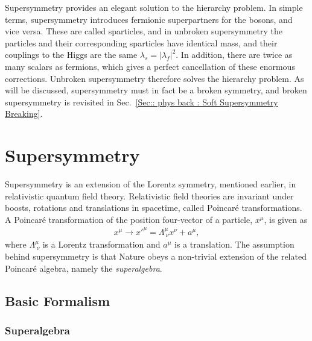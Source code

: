\documentclass[twoside,english]{uiofysmaster}
\begin{document}
Supersymmetry provides an elegant solution to the hierarchy problem. In simple terms, supersymmetry introduces fermionic superpartners for the bosons, and vice versa. These are called sparticles, and in unbroken supersymmetry the particles and their corresponding sparticles have identical mass, and their couplings to the Higgs are the same $\lambda_s = |\lambda_f|^2$. In addition, there are twice as many scalars as fermions, which gives a perfect cancellation of these enormous corrections. Unbroken supersymmetry therefore solves the hierarchy problem. As will be discussed, supersymmetry must in fact be a broken symmetry, and broken supersymmetry is revisited in Sec.~\ref{Sec:: phys back : Soft Supersymmetry Breaking}.


\section{Supersymmetry}

Supersymmetry is an extension of the Lorentz symmetry, mentioned earlier, in relativistic quantum field theory. Relativistic field theories are invariant under boosts, rotations and translations in spacetime, called Poincar\'{e} transformations. A Poincar\'{e} transformation of the position four-vector of a particle, $x^{\mu}$, is given as
\begin{align}
x^{\mu} \rightarrow x'^{\mu} = \Lambda^{\mu}_{\ \nu} x^{\nu} + a^{\mu}, 
\end{align}
where $\Lambda^{\mu}_{\ \nu}$ is a Lorentz transformation and $a^{\mu}$ is a translation. The assumption behind supersymmetry is that Nature obeys a non-trivial extension of the related Poincar\'{e} algebra, namely the \textit{superalgebra}. 

\subsection{Basic Formalism}

\subsubsection{Superalgebra}
\end{document}
